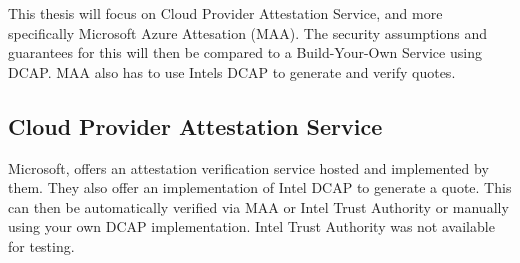 \begin{table}
\centering
{}
\caption{Overview of four different Attestation Verification methods}
\label{tab:AttestationVerification}
\end{table}
This thesis will focus on Cloud Provider Attestation Service, and more specifically Microsoft Azure Attesation (MAA). The security assumptions and guarantees for this will then be compared to a Build-Your-Own Service using DCAP. MAA also has to use Intels DCAP to generate and verify quotes. 

\subsection{Cloud Provider Attestation Service}
 Microsoft, offers an attestation verification service hosted and implemented by them. They also offer an implementation of Intel DCAP to generate a quote. This can then be automatically verified via MAA or Intel Trust Authority or manually using your own DCAP implementation. Intel Trust Authority was not available for testing.


